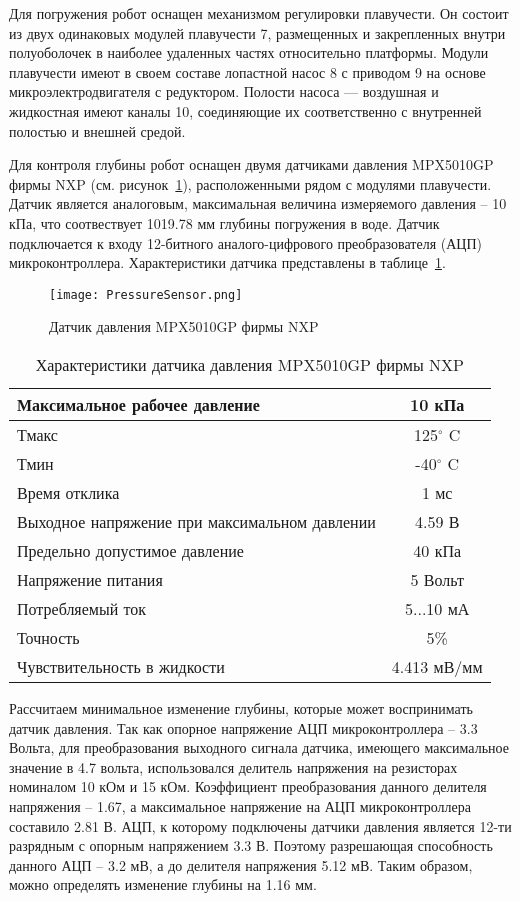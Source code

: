 Для погружения робот оснащен механизмом регулировки плавучести. Он состоит из двух одинаковых модулей плавучести 7, размещенных и закрепленных внутри полуоболочек в наиболее удаленных частях относительно платформы. Модули плавучести имеют в своем составе лопастной насос 8 с приводом 9 на основе микроэлектродвигателя с редуктором. Полости насоса --- воздушная и жидкостная имеют каналы 10, соединяющие их соответственно с внутренней полостью и внешней средой.

Для контроля глубины робот оснащен двумя датчиками давления MPX5010GP фирмы NXP (см. рисунок~\ref{PressureSensor}), расположенными рядом с модулями плавучести. Датчик является аналоговым, максимальная величина измеряемого давления -- 10 кПа, что соотвествует 1019.78 мм глубины погружения в воде. Датчик подключается к входу 12-битного аналого-цифрового преобразователя (АЦП) микроконтроллера. Характеристики датчика представлены в таблице~\ref{tabPressure}.

\begin{figure}[h]
	\centering
	\texttt{[image: PressureSensor.png]}%
	\caption{Датчик давления MPX5010GP фирмы NXP}
	\label{PressureSensor}
\end{figure}

\begin{table}[h]
	\centering
	\caption{Характеристики датчика давления MPX5010GP фирмы NXP}\label{tabPressure}
	\begin{tabular}{|l|c|}
		\hline
		Максимальное рабочее давление	&	10 кПа 	\\ \hline
		Тмакс	&	125$^\circ$ C 	\\ \hline
		Тмин 	&	-40$^\circ$ C \\ \hline
		Время отклика 	& 1 мс \\ \hline
		Выходное напряжение при максимальном давлении	&  4.59 В\\ \hline
		Предельно допустимое давление & 40 кПа \\ \hline
		Напряжение питания 	& 5 Вольт\\ \hline	
		Потребляемый ток	& 5...10 мА\\ \hline	
		Точность	& 5\% \\ \hline
		Чувствительность в жидкости	& 4.413 мВ/мм \\ \hline
	\end{tabular}
\end{table}

Рассчитаем минимальное изменение глубины, которые может воспринимать датчик давления. Так как опорное напряжение АЦП микроконтроллера -- 3.3 Вольта, для преобразования выходного сигнала датчика, имеющего максимальное значение в 4.7 вольта, использовался делитель напряжения на резисторах номиналом 10 кОм и 15 кОм. Коэффициент преобразования данного делителя напряжения -- 1.67, а максимальное напряжение на АЦП микроконтроллера составило 2.81 В. АЦП, к которому подключены датчики давления является 12-ти разрядным с опорным напряжением 3.3 В. Поэтому разрешающая способность данного АЦП -- 3.2 мВ, а до делителя напряжения 5.12 мВ. Таким образом, можно определять изменение глубины на 1.16 мм.




